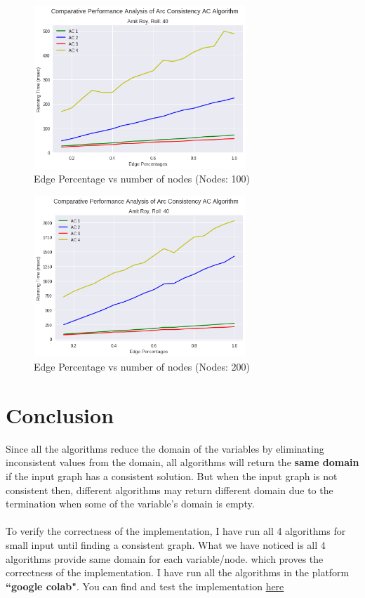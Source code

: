 \documentclass[11pt , conference]{IEEEtran}
\begin{document}
	\begin{figure}[h]
		\centering
		\includegraphics[width=8cm]{running_time_edge_100.png}
		\captionsetup{singlelinecheck = false, format= hang,  font=footnotesize, labelsep=space}
		\caption{Edge Percentage vs number of nodes (Nodes: 100)}
		\label{figure 3}
	\end{figure}
	
	\begin{figure}[h]
		\centering
		\includegraphics[width=8cm]{running_time_edge_200.png}
		\captionsetup{singlelinecheck = false, format= hang,  font=footnotesize, labelsep=space}
		\caption{Edge Percentage vs number of nodes (Nodes: 200)}
		\label{figure 4}
	\end{figure}

	\section{Conclusion}	
	\noindent
	Since all the algorithms reduce the domain of the variables by eliminating inconsistent values from the domain, all algorithms will return the \textbf{same domain} if the input graph has a consistent solution. But when the input graph is not consistent then, different algorithms may return different domain due to the termination when some of the variable's domain is empty.\\\\To verify the correctness of the implementation, I have run all 4 algorithms for small input until finding a consistent graph. What we have noticed is all 4 algorithms provide same domain for each variable/node. which proves the correctness of the implementation. I have run all the algorithms in the platform \textbf{``google colab"}. You can find and test the implementation \href{https://tinyurl.com/solutionAC-040}{here}
	
	
	
	\newpage
	 
	
	
\end{document}
